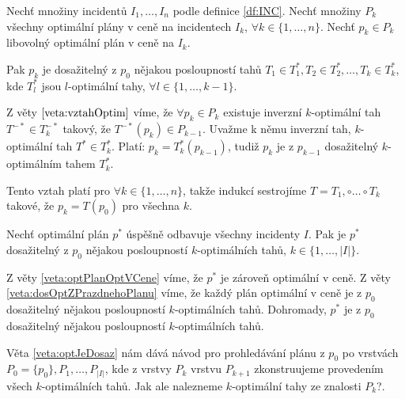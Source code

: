 \begin{veta}\label{veta:dosOptZPrazdnehoPlanu}
  Nechť množiny incidentů $I_1, \dots, I_n$ podle definice \ref{df:INC}.
  Nechť množiny $P_{k}$ všechny optimální plány v ceně na incidentech $I_k$, $\forall k \in \{ 1, \dots, n \}$.
  Nechť $p_k \in P_k$ libovolný optimální plán v ceně na $I_k$.

  Pak $p_k$ je dosažitelný z $p_0$ nějakou posloupností tahů $T_1 \in T^*_1, T_2 \in T^*_2, \dots, T_k \in T^*_k$, kde $T^*_l$ jsou $l$-optimální tahy, $\forall l \in \{ 1, \dots, k-1 \}$.
\end{veta}
\begin{dukaz}
  Z věty $\ref{veta:vztahOptim}$ víme, že $\forall p_k \in P_k$ existuje inverzní $k$-optimální tah $T^{-*} \in T^{-*}_k$ takový, že $T^{-*}(p_k) \in P_{k-1}$.
  Uvažme k němu inverzní tah, $k$-optimální tah $T^* \in T^{*}_k$.
  Platí: $p_k = T^*_k(p_{k-1})$, tudiž $p_{k}$ je z $p_{k-1}$ dosažitelný $k$-optimálním tahem $T^*_k$.

  Tento vztah platí pro $\forall k \in \{ 1, \dots, n \}$, takže indukcí sestrojíme $T = T_1, \circ \dots \circ T_k$ takové, že $p_k = T(p_0)$ pro všechna $k$.
\end{dukaz}

\begin{veta}\label{veta:optJeDosaz}
  Nechť optimální plán $p^*$ úspěšně odbavuje všechny incidenty $I$.
  Pak je $p^*$ dosažitelný z $p_0$ nějakou posloupností $k$-optimálních tahů, $k \in \{ 1, \dots, |I| \}$.
\end{veta}
\begin{dukaz}
  Z věty \ref{veta:optPlanOptVCene} víme, že $p^*$ je zároveň optimální v ceně.
  Z věty \ref{veta:dosOptZPrazdnehoPlanu} víme, že každý plán optimální v ceně je z $p_0$ dosažitelný nějakou posloupností $k$-optimálních tahů.
  Dohromady, $p^*$ je z $p_0$ dosažitelný nějakou posloupností $k$-optimálních tahů.
\end{dukaz}

Věta \ref{veta:optJeDosaz} nám dává návod pro prohledávání plánu z $p_0$ po vrstvách $P_0 = \{ p_0\}, P_1, \dots, P_{|I|}$, 
kde z vrstvy $P_k$ vrstvu $P_{k+1}$ zkonstruujeme provedením všech $k$-optimálních tahů.
Jak ale nalezneme $k$-optimální tahy ze znalosti $P_k$?.

